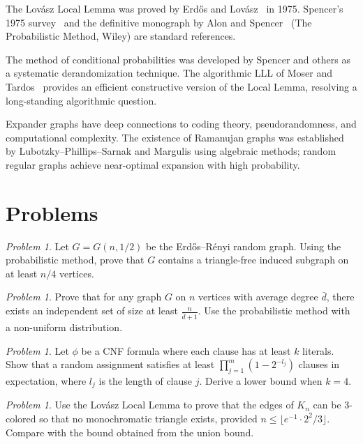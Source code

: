 \documentclass[twoside,12pt]{book}
\theoremstyle{plain}
\theoremstyle{definition}
\theoremstyle{remark}
\newtheorem{problem}[theorem]{Problem}
\begin{document}
The Lov\'{a}sz Local Lemma was proved by Erd\H{o}s and
Lov\'{a}sz~\cite{lovasz1975} in 1975. Spencer's 1975
survey~\cite{spencer1975} and the definitive monograph by Alon and
Spencer~\cite{alonspencer1992} (The Probabilistic Method, Wiley) are
standard references.

The method of conditional probabilities was developed by Spencer and
others as a systematic derandomization technique. The algorithmic LLL of
Moser and Tardos~\cite{mosertardos2010} provides an efficient constructive
version of the Local Lemma, resolving a long-standing algorithmic question.

Expander graphs have deep connections to coding theory, pseudorandomness,
and computational complexity. The existence of Ramanujan graphs was
established by Lubotzky--Phillips--Sarnak and Margulis using algebraic
methods; random regular graphs achieve near-optimal expansion with high
probability.

\section*{Problems}

\begin{problem}
Let $G = G(n, 1/2)$ be the Erd\H{o}s--R\'{e}nyi random graph. Using the
probabilistic method, prove that $G$ contains a triangle-free induced
subgraph on at least $n/4$ vertices.
\end{problem}

\begin{problem}
Prove that for any graph $G$ on $n$ vertices with average degree $\bar{d}$,
there exists an independent set of size at least $\frac{n}{\bar{d} + 1}$.
Use the probabilistic method with a non-uniform distribution.
\end{problem}

\begin{problem}
Let $\phi$ be a CNF formula where each clause has at least $k$ literals.
Show that a random assignment satisfies at least $\prod_{j=1}^{m}
(1 - 2^{-l_j})$ clauses in expectation, where $l_j$ is the length of
clause $j$. Derive a lower bound when $k = 4$.
\end{problem}

\begin{problem}
Use the Lov\'{a}sz Local Lemma to prove that the edges of $K_n$ can be
3-colored so that no monochromatic triangle exists, provided $n \leq
\lfloor e^{-1} \cdot 2^2 / 3 \rfloor$. Compare with the bound obtained
from the union bound.
\end{problem}
\end{document}
